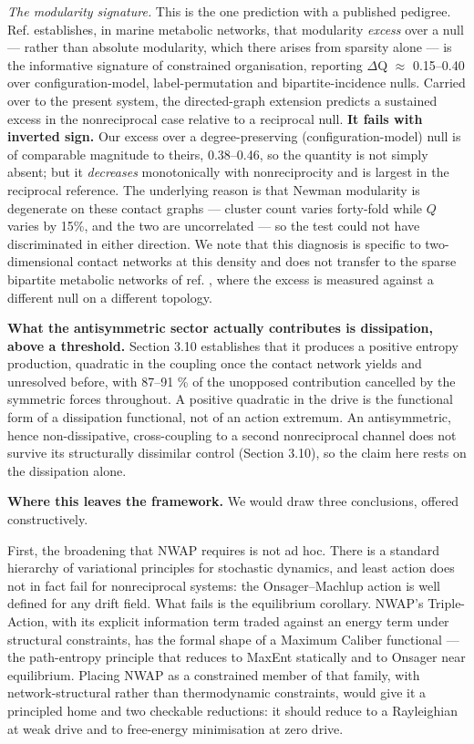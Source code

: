 \documentclass[aps,pre,preprint,superscriptaddress,nofootinbib,longbibliography]{revtex4-2}
\begin{document}
\emph{The modularity signature.} This is the one prediction with a published pedigree. Ref. \cite{r30} establishes, in marine metabolic networks, that modularity \emph{excess} over a null --- rather than absolute modularity, which there arises from sparsity alone --- is the informative signature of constrained organisation, reporting $\Delta$Q $\approx$ 0.15--0.40 over configuration-model, label-permutation and bipartite-incidence nulls. Carried over to the present system, the directed-graph extension predicts a sustained excess in the nonreciprocal case relative to a reciprocal null. \textbf{It fails with inverted sign.} Our excess over a degree-preserving (configuration-model) null is of comparable magnitude to theirs, 0.38--0.46, so the quantity is not simply absent; but it \emph{decreases} monotonically with nonreciprocity and is largest in the reciprocal reference. The underlying reason is that Newman modularity is degenerate on these contact graphs --- cluster count varies forty-fold while $Q$ varies by 15\%, and the two are uncorrelated --- so the test could not have discriminated in either direction. We note that this diagnosis is specific to two-dimensional contact networks at this density and does not transfer to the sparse bipartite metabolic networks of ref. \cite{r30}, where the excess is measured against a different null on a different topology.

\textbf{What the antisymmetric sector actually contributes is dissipation, above a threshold.} Section 3.10 establishes that it produces a positive entropy production, quadratic in the coupling once the contact network yields and unresolved before, with 87--91 \% of the unopposed contribution cancelled by the symmetric forces throughout. A positive quadratic in the drive is the functional form of a dissipation functional, not of an action extremum. An antisymmetric, hence non-dissipative, cross-coupling to a second nonreciprocal channel does not survive its structurally dissimilar control (Section 3.10), so the claim here rests on the dissipation alone.

\textbf{Where this leaves the framework.} We would draw three conclusions, offered constructively.

First, the broadening that NWAP requires is not ad hoc. There is a standard hierarchy of variational principles for stochastic dynamics, and least action does not in fact fail for nonreciprocal systems: the Onsager--Machlup action is well defined for any drift field. What fails is the equilibrium corollary. NWAP's Triple-Action, with its explicit information term traded against an energy term under structural constraints, has the formal shape of a Maximum Caliber functional \cite{r10} --- the path-entropy principle that reduces to MaxEnt statically and to Onsager near equilibrium. Placing NWAP as a constrained member of that family, with network-structural rather than thermodynamic constraints, would give it a principled home and two checkable reductions: it should reduce to a Rayleighian at weak drive and to free-energy minimisation at zero drive.
\end{document}

